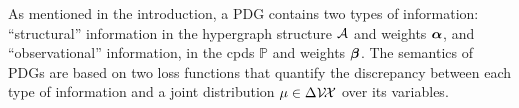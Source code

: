 \documentclass{article}
\begin{document}
As mentioned in the introduction, a PDG contains two types of information:
``structural'' information in the hypergraph structure $\mathcal A$ and
weights $\boldsymbol\alpha$, and ``observational'' information, 
in the cpds 
$\mathbb P$ and weights $\boldsymbol\beta$.
The semantics of PDGs are based on two loss functions
that quantify the discrepancy between 
each type of information and a joint distribution
$\mu \in \Delta \mathcal V \!\mathcal X$ over its variables.
\end{document}
